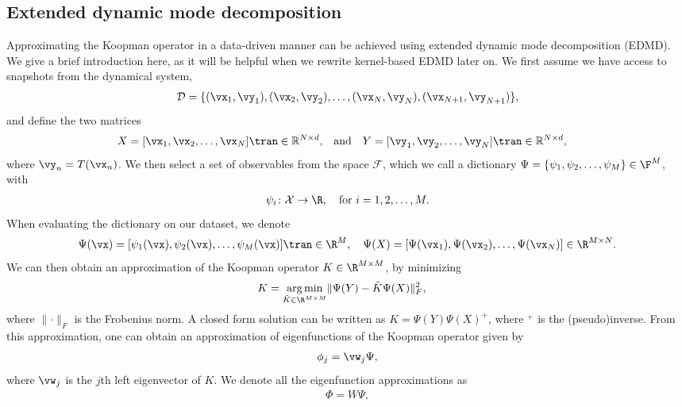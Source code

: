 \documentclass{article}
\begin{document}
\subsection{Extended dynamic mode decomposition}
Approximating the Koopman operator in a data-driven manner can be achieved using extended dynamic mode decomposition (EDMD). We give a brief introduction here, as it will be helpful when we rewrite kernel-based EDMD later on. We first assume we have access to snapshots from the dynamical system, 
\begin{align*}
    \mathcal{D} = \{(\vx_1, \vy_1), (\vx_2, \vy_2), \dots, (\vx_N, \vy_N), (\vx_{N+1}, \vy_{N+1})\},
\end{align*}
and define the two matrices
\begin{align*}
    X = [\vx_1, \vx_2, \dots, \vx_N]\tran \in \mathbb{R}^{N\times d}, \quad &\text{and}\quad Y= [\vy_1, \vy_2, \dots, \vy_N]\tran \in \mathbb{R}^{N\times d},
\end{align*} 
where \(\vy_n = T(\vx_n)\). We then select a set of observables from the space \(\mathcal{F}\), which we call a dictionary \(\Psi = \{\psi_1, \psi_2, \dots, \psi_M\} \in \F^{M}\), with
\begin{align*}
    \psi_i \colon \mathcal{X} \rightarrow \R,\quad \text{for } i=1,2,\dots, M.
\end{align*} 
When evaluating the dictionary on our dataset, we denote
\begin{align*}
    \Psi(\vx) = [\psi_1(\vx), \psi_2(\vx), \dots, \psi_M(\vx)]\tran \in \R^M, \quad \Psi(X) = [\Psi(\vx_1), \Psi(\vx_2), \dots, \Psi(\vx_N)] \in \R^{M \times N}.
\end{align*}
We can then obtain an approximation of the Koopman operator \(K\in \R^{M\times M}\), by minimizing 
\begin{align}\label{eq:opt_full_K}
     K&= \underset{\tilde{K} \in \R^{M\times M}}{\arg\min} \lVert \Psi(Y) - \tilde{K}\Psi(X) \rVert^2_F,
\end{align}
where \(\lVert \cdot \rVert_F\) is the Frobenius norm. A closed form solution can be written as \(K = \Psi(Y) \Psi(X)^+\), where \(^+\) is the (pseudo)inverse. From this approximation, one can obtain an approximation of eigenfunctions of the Koopman operator given by
\begin{align*}
    \phi_j = \vw_j \Psi,
\end{align*}
where \(\vw_j\) is the \(j\)th left eigenvector of \(K\). We denote all the eigenfunction approximations as 
\begin{align*}
    \Phi = W \Psi,
\end{align*}
\end{document}
